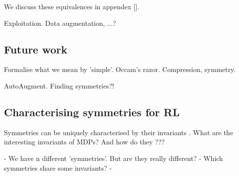 We discuss these equivalences in appendex [].



Exploitation. Data augmentation, ...?


\subsection{Future work}

Formalise what we mean by 'simple'. Occam's razor. Compression, symmetry.

AutoAugment. Finding symmetries?!
\cite{Ho2019a}

\subsection{Characterising symmetries for RL}

Symmetries can be uniquely characterised by their invariants \cite{PeterOlver1999}.
What are the interesting invariants of MDPs? And how do they ???

- We have n different 'symmetries'. But are they really different?
- Which symmetries share some invariants?
-
